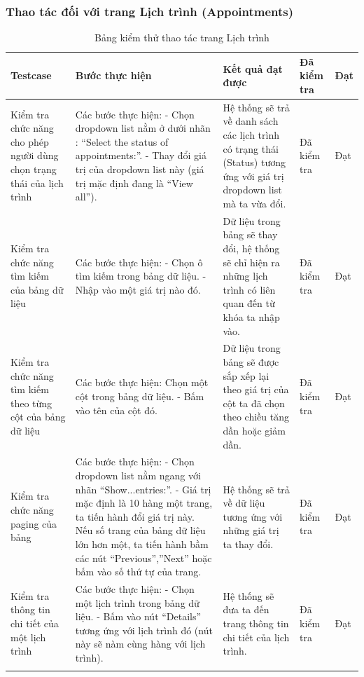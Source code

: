 \documentclass[a4paper]{article}
\begin{document}
\subsubsection{Thao tác đối với trang Lịch trình (Appointments)}
\begin{longtable}{ | p{} |p{} | p{}  | p{}  | p{}  | } 
\hline
\textbf{Testcase}& \textbf{Bước thực hiện}& \textbf{Kết quả đạt được} & \textbf{Đã kiểm tra}& \textbf{Đạt} \\ 
\hline
\hline
Kiểm tra chức năng cho phép người dùng chọn trạng thái của lịch trình &
Các bước thực hiện: \newline
- Chọn dropdown list nằm ở dưới nhãn : “Select the status of appointments:”. \newline
- Thay đổi giá trị của dropdown list này (giá trị mặc định đang là “View all”).
&
Hệ thống sẽ trả về danh sách các lịch trình có trạng thái (Status) tương ứng với giá trị dropdown list mà ta vừa đổi. &
Đã kiểm tra &
Đạt \\

\hline
Kiểm tra chức năng tìm kiếm của bảng dữ liệu &
Các bước thực hiện: \newline
- Chọn ô tìm kiếm trong bảng dữ liệu. \newline
- Nhập vào một giá trị nào đó. 
&
Dữ liệu trong bảng sẽ thay đổi, hệ thống sẽ chỉ hiện ra những lịch trình có liên quan đến từ khóa ta nhập vào. &
Đã kiểm tra &
Đạt \\

\hline
Kiểm tra chức năng tìm kiếm theo từng cột của bảng dữ liệu &
Các bước thực hiện:
Chọn một cột trong bảng dữ liệu. \newline
- Bấm vào tên của cột đó.  \newline
&
Dữ liệu trong bảng sẽ được sắp xếp lại theo giá trị của cột ta đã chọn theo chiều tăng dần hoặc giảm dần. &
Đã kiểm tra &
Đạt \\

\hline
Kiểm tra chức năng paging của bảng &
Các bước thực hiện: \newline
- Chọn dropdown list nằm ngang với nhãn “Show...entries:”.  \newline
- Giá trị mặc định là 10 hàng một trang, ta tiến hành đổi giá trị này. Nếu số trang của bảng dữ liệu lớn hơn một, ta tiến hành bầm các nút “Previous”,”Next” hoặc bấm vào số thứ tự của trang.
&
Hệ thống sẽ trả về dữ liệu tương ứng với những giá trị ta thay đổi. &
Đã kiểm tra &
Đạt \\


\hline
Kiểm tra thông tin chi tiết của một lịch trình &
Các bước thực hiện: \newline
-  Chọn một lịch trình trong bảng dữ liệu. \newline
-  Bấm vào nút “Details” tương ứng với lịch trình đó (nút này sẽ nàm cùng hàng với lịch trình). &
Hệ thống sẽ đưa ta đến trang thông tin chi tiết của lịch trình.&
Đã kiểm tra &
Đạt \\

\hline
\caption{Bảng kiểm thử thao tác trang Lịch trình}
\end{longtable}
\end{document}
